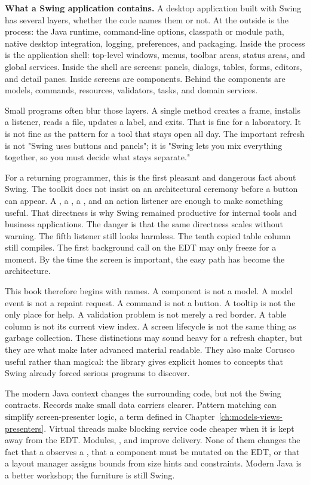 \textbf{What a Swing application contains.} A desktop application built with Swing has several layers, whether the code names them or not. At the outside is the process: the Java runtime, command-line options, classpath or module path, native desktop integration, logging, preferences, and packaging. Inside the process is the application shell: top-level windows, menus, toolbar areas, status areas, and global services. Inside the shell are screens: panels, dialogs, tables, forms, editors, and detail panes. Inside screens are components. Behind the components are models, commands, resources, validators, tasks, and domain services.

Small programs often blur those layers. A single  method creates a frame, installs a listener, reads a file, updates a label, and exits. That is fine for a laboratory. It is not fine as the pattern for a tool that stays open all day. The important refresh is not "Swing uses buttons and panels"; it is "Swing lets you mix everything together, so you must decide what stays separate."

For a returning programmer, this is the first pleasant and dangerous fact about Swing. The toolkit does not insist on an architectural ceremony before a button can appear. A , a , a , and an action listener are enough to make something useful. That directness is why Swing remained productive for internal tools and business applications. The danger is that the same directness scales without warning. The fifth listener still looks harmless. The tenth copied table column still compiles. The first background call on the EDT may only freeze for a moment. By the time the screen is important, the easy path has become the architecture.

This book therefore begins with names. A component is not a model. A model event is not a repaint request. A command is not a button. A tooltip is not the only place for help. A validation problem is not merely a red border. A table column is not its current view index. A screen lifecycle is not the same thing as garbage collection. These distinctions may sound heavy for a refresh chapter, but they are what make later advanced material readable. They also make Corusco useful rather than magical: the library gives explicit homes to concepts that Swing already forced serious programs to discover.

The modern Java context changes the surrounding code, but not the Swing contracts. Records make small data carriers clearer. Pattern matching can simplify screen-presenter logic, a term defined in Chapter~\ref{ch:models-views-presenters}. Virtual threads make blocking service code cheaper when it is kept away from the EDT. Modules, , and  improve delivery. None of them changes the fact that a  observes a , that a component must be mutated on the EDT, or that a layout manager assigns bounds from size hints and constraints. Modern Java is a better workshop; the furniture is still Swing.

